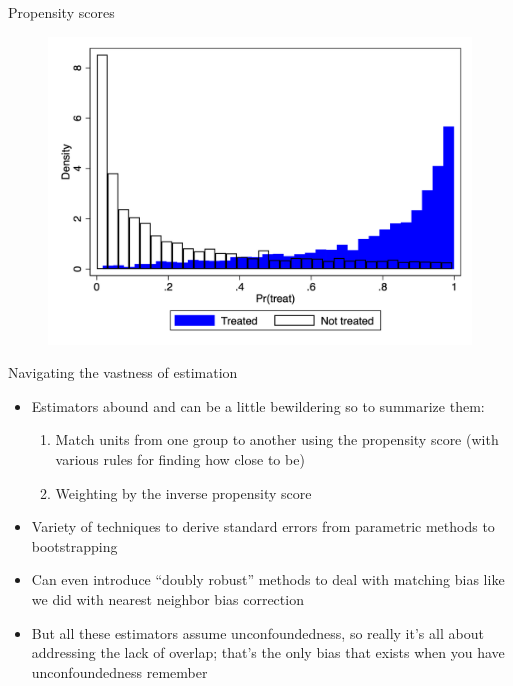 \documentclass{beamer}
\begin{document}
\begin{frame}{Propensity scores}

  \begin{figure}
    \includegraphics[scale=0.25]{./lecture_includes/pscore_histogram}
  \end{figure}
  
\end{frame}




\begin{frame}{Navigating the vastness of estimation}

\begin{itemize}
\item Estimators abound and can be a little bewildering so to summarize them:
	\begin{enumerate}
	\item Match units from one group to another using the propensity score (with various rules for finding how close to be)
	\item Weighting by the inverse propensity score
	\end{enumerate}
\item Variety of techniques to derive standard errors from parametric methods to bootstrapping
\item Can even introduce ``doubly robust'' methods to deal with matching bias like we did with nearest neighbor bias correction
\item But all these estimators assume unconfoundedness, so really it's all about addressing the lack of overlap; that's the only bias that exists when you have unconfoundedness remember
\end{itemize}

\end{frame}
\end{document}
